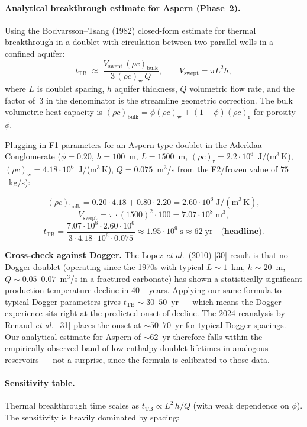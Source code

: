\documentclass{article}
\begin{document}
\paragraph{Analytical breakthrough estimate for Aspern (Phase~2).}
Using the Bodvarsson--Tsang (1982) closed-form estimate for thermal
breakthrough in a doublet with circulation between two parallel wells
in a confined aquifer:
\[
t_{\mathrm{TB}} \;\approx\;
\frac{V_{\mathrm{swept}}\,(\rho c)_{\mathrm{bulk}}}
     {3\,(\rho c)_{\mathrm{w}}\,Q}, \qquad
V_{\mathrm{swept}} = \pi L^{2} h,
\]
where $L$ is doublet spacing, $h$ aquifer thickness, $Q$ volumetric
flow rate, and the factor of~3 in the denominator is the streamline
geometric correction. The bulk volumetric heat capacity is
$(\rho c)_{\mathrm{bulk}} = \phi (\rho c)_{\mathrm{w}} +
(1-\phi)(\rho c)_{\mathrm{r}}$ for porosity $\phi$.

Plugging in F1 parameters for an Aspern-type doublet in the
Aderklaa Conglomerate ($\phi = 0.20$, $h = 100$~m, $L = 1500$~m,
$(\rho c)_{\mathrm{r}} = 2.2\cdot 10^{6}$~J/(m$^3$\,K), $(\rho c)_{\mathrm{w}}
= 4.18\cdot 10^{6}$~J/(m$^3$\,K), $Q = 0.075$~m$^3$/s from the
F2/frozen value of $75$~kg/s):

\[
(\rho c)_{\mathrm{bulk}} = 0.20 \cdot 4.18 + 0.80 \cdot 2.20
= 2.60 \cdot 10^{6}\;\mathrm{J/(m^3\,K)},
\]
\[
V_{\mathrm{swept}} = \pi \cdot (1500)^{2} \cdot 100
= 7.07 \cdot 10^{8}\;\mathrm{m^3},
\]
\[
t_{\mathrm{TB}} = \frac{7.07\cdot 10^{8} \cdot 2.60\cdot 10^{6}}
                       {3\cdot 4.18\cdot 10^{6}\cdot 0.075}
\approx 1.95\cdot 10^{9}\;\mathrm{s}
\approx 62\;\mathrm{yr}\quad\textbf{(headline)}.
\]

\textbf{Cross-check against Dogger.} The Lopez \emph{et al.}\ (2010) [30]
result is that no Dogger doublet (operating since the 1970s with typical
$L\sim 1$~km, $h\sim 20$~m, $Q\sim 0.05$--$0.07$~m$^3$/s in a fractured
carbonate) has shown a statistically significant production-temperature
decline in 40+ years. Applying our same formula to typical Dogger
parameters gives $t_{\mathrm{TB}} \sim 30$--$50$~yr --- which means the
Dogger experience sits right at the predicted onset of decline. The
2024 reanalysis by Renaud \emph{et al.}\ [31] places the onset at
$\sim 50$--$70$~yr for typical Dogger spacings. Our analytical
estimate for Aspern of $\sim 62$~yr therefore falls within the
empirically observed band of low-enthalpy doublet lifetimes in
analogous reservoirs --- not a surprise, since the formula is
calibrated to those data.

\paragraph{Sensitivity table.} Thermal breakthrough time scales as
$t_{\mathrm{TB}} \propto L^{2}\,h / Q$ (with weak dependence on
$\phi$). The sensitivity is heavily dominated by spacing:
\end{document}
